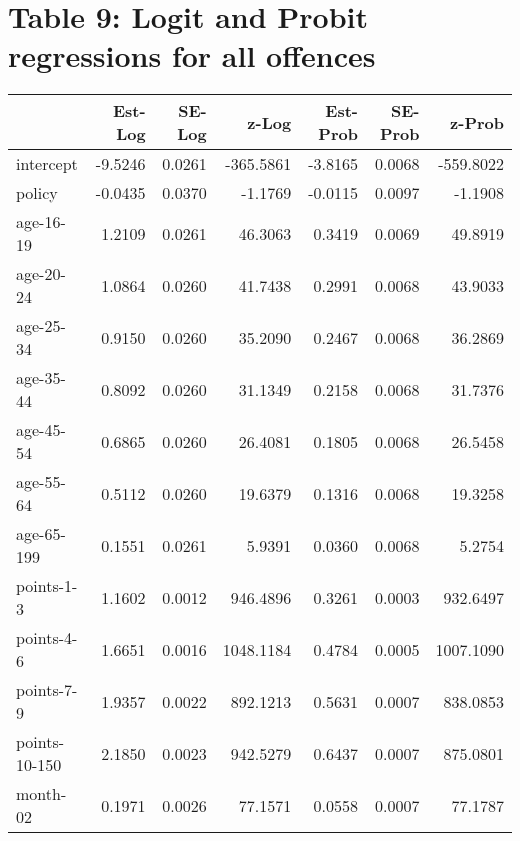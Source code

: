 






\section{Table 9: Logit and Probit regressions for all offences}




\begin{table}[ht]
\centering
\begin{tabular}{lrrrrrr}
  \hline
 & Est-Log & SE-Log & z-Log & Est-Prob & SE-Prob & z-Prob \\ 
  \hline
intercept & -9.5246 & 0.0261 & -365.5861 & -3.8165 & 0.0068 & -559.8022 \\ 
  policy & -0.0435 & 0.0370 & -1.1769 & -0.0115 & 0.0097 & -1.1908 \\ 
  age-16-19 & 1.2109 & 0.0261 & 46.3063 & 0.3419 & 0.0069 & 49.8919 \\ 
  age-20-24 & 1.0864 & 0.0260 & 41.7438 & 0.2991 & 0.0068 & 43.9033 \\ 
  age-25-34 & 0.9150 & 0.0260 & 35.2090 & 0.2467 & 0.0068 & 36.2869 \\ 
  age-35-44 & 0.8092 & 0.0260 & 31.1349 & 0.2158 & 0.0068 & 31.7376 \\ 
  age-45-54 & 0.6865 & 0.0260 & 26.4081 & 0.1805 & 0.0068 & 26.5458 \\ 
  age-55-64 & 0.5112 & 0.0260 & 19.6379 & 0.1316 & 0.0068 & 19.3258 \\ 
  age-65-199 & 0.1551 & 0.0261 & 5.9391 & 0.0360 & 0.0068 & 5.2754 \\ 
  points-1-3 & 1.1602 & 0.0012 & 946.4896 & 0.3261 & 0.0003 & 932.6497 \\ 
  points-4-6 & 1.6651 & 0.0016 & 1048.1184 & 0.4784 & 0.0005 & 1007.1090 \\ 
  points-7-9 & 1.9357 & 0.0022 & 892.1213 & 0.5631 & 0.0007 & 838.0853 \\ 
  points-10-150 & 2.1850 & 0.0023 & 942.5279 & 0.6437 & 0.0007 & 875.0801 \\ 
  month-02 & 0.1971 & 0.0026 & 77.1571 & 0.0558 & 0.0007 & 77.1787 \\ 

\end{tabular}
\end{table}
